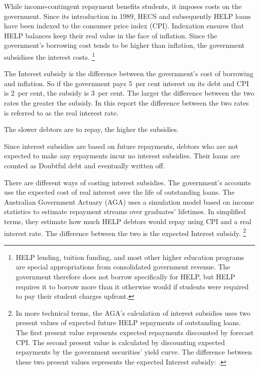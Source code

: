 \documentclass[embargoed]{grattan}
\begin{document}
While income-contingent repayment benefits students, it imposes costs on the government. 
Since its introduction in 1989, \gls{HECS} and subsequently \gls{HELP} loans have been indexed to the consumer price index (\gls{CPI}\@).
Indexation ensures that \gls{HELP} balances keep their real value in the face of inflation.
Since the government’s borrowing cost tends to be higher than inflation, the government subsidises the interest costs.%
\footnote{\gls{HELP} lending, tuition funding, and most other higher education programs are special appropriations from consolidated government revenue.
The government therefore does not borrow specifically for \gls{HELP}, but \gls{HELP} requires it to borrow more than it otherwise would if students were required to pay their student charges upfront.}

The \gls{Interest subsidy} is the difference between the government's cost of borrowing and inflation.
So if the government pays 5~per cent interest on its debt and \gls{CPI} is 2~per cent, the subsidy is 3~per cent.
The larger the difference between the two rates the greater the subsidy.
In this report the difference between the two rates is referred to as the real interest rate.

The slower debtors are to repay, the higher the subsidies. 

Since interest subsidies are based on future repayments, debtors who are not expected to make any repayments incur no interest subsidies.
Their loans are counted as \gls{Doubtful debt} and eventually written off.

There are different ways of costing interest subsidies.
The government's accounts use the expected cost of real interest over the life of outstanding loans.
The Australian Government Actuary (\gls{AGA}) uses a simulation model based on income statistics to estimate repayment streams over graduates' lifetimes.
In simplified terms, they estimate how much \gls{HELP} debtors would repay using \gls{CPI} and a real interest rate.
The difference between the two is the expected \gls{Interest subsidy}.%
\footnote{In more technical terms, the \gls{AGA}'s calculation of interest subsidies uses two present values of expected future \gls{HELP} repayments of outstanding loans.
The first present value represents expected repayments discounted by forecast \gls{CPI}\@.
The second present value is calculated by discounting expected repayments by the government securities' yield curve.
The difference between these two present values represents the expected \gls{Interest subsidy}: \textcite[][Appendix~A]{Consulting2013PrivatisationHECSdebt}.}
\end{document}
